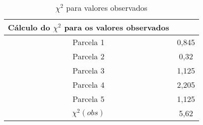 \begin{table}[htpb]
\begin{center}
\begin{tabular}{cc}
\toprule
Cálculo do $\chi^2$ para os valores observados &  \\ \midrule
Parcela 1 &  0,845\\ 
Parcela 2 & 0,32  \\ 
Parcela 3 & 1,125 \\
Parcela 4 & 2,205 \\ 
Parcela 5 & 1,125 \\ \midrule 
$\chi^2(obs)$ & 5,62 \\ \bottomrule
\end{tabular}
\end{center}
\caption{$\chi^{2}$ para valores observados}
\label{tab:tabela41}
\end{table}

